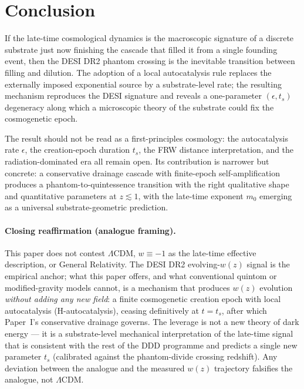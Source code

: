 \documentclass[11pt,a4paper]{article}
\begin{document}
\FloatBarrier
\section{Conclusion}

If the late-time cosmological dynamics is the macroscopic signature
of a discrete substrate just now finishing the cascade that filled
it from a single founding event, then the DESI DR2 phantom crossing
is the inevitable transition between filling and dilution. The
adoption of a local autocatalysis rule replaces the externally
imposed exponential source by a substrate-level rate; the resulting
mechanism reproduces the DESI signature and reveals a one-parameter
$(\epsilon, t_s)$ degeneracy along which a microscopic theory of the
substrate could fix the cosmogenetic epoch.

The result should not be read as a first-principles cosmology: the
autocatalysis rate $\epsilon$, the creation-epoch duration $t_s$,
the FRW distance interpretation, and the radiation-dominated era all
remain open. Its contribution is narrower but concrete: a conservative
drainage cascade with finite-epoch self-amplification produces a
phantom-to-quintessence transition with the right qualitative shape
and quantitative parameters at $z \lesssim 1$, with the late-time
exponent $m_0$ emerging as a universal substrate-geometric prediction.






\paragraph{Closing reaffirmation (analogue framing).}
This paper does not contest $\Lambda$CDM, $w \equiv -1$ as the
late-time effective description, or General Relativity. The
DESI DR2 evolving-$w(z)$ signal is the empirical anchor; what
this paper offers, and what conventional quintom or modified-gravity
models cannot, is a mechanism that produces $w(z)$ evolution
\emph{without adding any new field}: a finite cosmogenetic
creation epoch with local autocatalysis (H-autocatalysis),
ceasing definitively at $t = t_s$, after which Paper~I's
conservative drainage governs. The leverage is not a new
theory of dark energy --- it is a substrate-level mechanical
interpretation of the late-time signal that is consistent with
the rest of the DDD programme and predicts a single new
parameter $t_s$ (calibrated against the phantom-divide crossing
redshift). Any deviation between the analogue and the measured
$w(z)$ trajectory falsifies the analogue, not $\Lambda$CDM.
\end{document}
